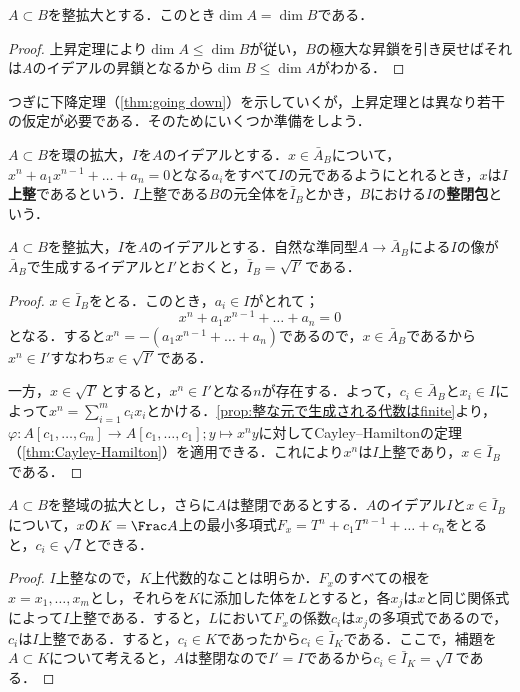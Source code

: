 \begin{cor}
	$A\subset B$を整拡大とする．このとき$\dim A=\dim B$である．
\end{cor}

\begin{proof}
	上昇定理により$\dim A\leq\dim B$が従い，$B$の極大な昇鎖を引き戻せばそれは$A$のイデアルの昇鎖となるから$\dim B\leq\dim A$がわかる．
\end{proof}

つぎに下降定理（\ref{thm:going down}）を示していくが，上昇定理とは異なり若干の仮定が必要である．そのためにいくつか準備をしよう．

\begin{defi}
	$A\subset B$を環の拡大，$I$を$A$のイデアルとする．$x\in\bar{A}_B$について，$x^n+a_1x^{n-1}+\dots+a_n=0$となる$a_i$をすべて$I$の元であるようにとれるとき，$x$は$I$\textbf{上整}であるという．$I$上整である$B$の元全体を$\bar{I}_B$とかき，$B$における$I$の\textbf{整閉包}という．
\end{defi}

\begin{lem}\label{lem:イデアルの整閉包と根基}
	$A\subset B$を整拡大，$I$を$A$のイデアルとする．自然な準同型$A\to \bar{A}_B$による$I$の像が$\bar{A}_B$で生成するイデアルと$I'$とおくと，$\bar{I}_B=\sqrt{I'}$である．
\end{lem}

\begin{proof}
	$x\in\bar{I}_B$をとる．このとき，$a_i\in I$がとれて；
	\[x^n+a_1x^{n-1}+\dots+a_n=0\]
	となる．すると$x^n=-(a_1x^{n-1}+\dots+a_n)$であるので，$x\in\bar{A}_B$であるから$x^n\in I'$すなわち$x\in\sqrt{I'}$である．
	
	一方，$x\in\sqrt{I'}$とすると，$x^n\in I'$となる$n$が存在する．よって，$c_i\in\bar{A}_B$と$x_i\in I$によって$x^n=\sum_{i=1}^m c_ix_i$とかける．\ref{prop:整な元で生成される代数はfinite}より，$\varphi:A[c_1,\dots,c_m]\to A[c_1,\dots,c_1];y\mapsto x^ny$に対してCayley--Hamiltonの定理（\ref{thm:Cayley-Hamilton}）を適用できる．これにより$x^n$は$I$上整であり，$x\in\bar{I}_B$である．
\end{proof}

\begin{prop}\label{prop:整なら最小多項式が根基からとれる}
	$A\subset B$を整域の拡大とし，さらに$A$は整閉であるとする．$A$のイデアル$I$と$x\in\bar{I}_B$について，$x$の$K=\Frac A$上の最小多項式$F_x=T^n+c_1T^{n-1}+\dots+c_n$をとると，$c_i\in\sqrt{I}$とできる．
\end{prop}

\begin{proof}
	$I$上整なので，$K$上代数的なことは明らか．$F_x$のすべての根を$x=x_1,\dots,x_m$とし，それらを$K$に添加した体を$L$とすると，各$x_j$は$x$と同じ関係式によって$I$上整である．すると，$L$において$F_x$の係数$c_i$は$x_j$の多項式であるので，$c_i$は$I$上整である．すると，$c_i\in K$であったから$c_i\in\bar{I}_K$である．ここで，補題を$A\subset K$について考えると，$A$は整閉なので$I'=I$であるから$c_i\in\bar{I}_K=\sqrt{I}$である．
\end{proof}

